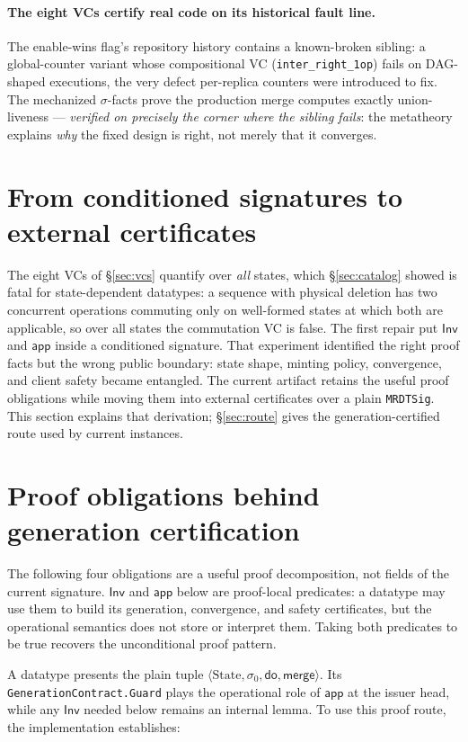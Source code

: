 \documentclass[11pt]{article}
\newcommand{\lean}[1]{\texttt{#1}}
\newcommand{\st}{\sigma}
\newcommand{\ini}{\st_0}
\newcommand{\dodo}{\mathsf{do}}
\newcommand{\merge}{\mathsf{merge}}
\newcommand{\Inv}{\mathsf{Inv}}
\newcommand{\app}{\mathsf{app}}
\begin{document}
\paragraph{The eight VCs certify real code on its historical fault
line.} The enable-wins flag's repository history contains a
known-broken sibling: a global-counter variant whose compositional VC
(\lean{inter\_right\_1op}) fails on DAG-shaped executions, the very defect
per-replica counters were introduced to fix. The mechanized $\sigma$-facts
prove the production merge computes exactly union-liveness ---
\emph{verified on precisely the corner where the sibling fails}: the
metatheory explains \emph{why} the fixed design is right, not merely that
it converges.


\section{From conditioned signatures to external certificates}
\label{sec:condmeta}

The eight VCs of \S\ref{sec:vcs} quantify over \emph{all} states, which
\S\ref{sec:catalog} showed is fatal for state-dependent datatypes: a
sequence with physical deletion has two concurrent operations commuting
only on well-formed states at which both are applicable, so over all
states the commutation VC is false. The first repair put $\Inv$ and $\app$
inside a conditioned signature. That experiment identified the right proof
facts but the wrong public boundary: state shape, minting policy, convergence,
and client safety became entangled. The current artifact retains the useful
proof obligations while moving them into external certificates over a plain
\lean{MRDTSig}. This section explains that derivation; \S\ref{sec:route} gives
the generation-certified route used by current instances.

\section{Proof obligations behind generation certification}\label{sec:cvcs}

The following four obligations are a useful proof decomposition, not fields of
the current signature. $\Inv$ and $\app$ below are proof-local predicates: a
datatype may use them to build its generation, convergence, and safety
certificates, but the operational semantics does not store or interpret them.
Taking both predicates to be true recovers the unconditional proof pattern.

A datatype presents the plain tuple
$\langle \text{State}, \ini, \dodo, \merge \rangle$. Its
\lean{GenerationContract.Guard} plays the operational role of $\app$ at the
issuer head, while any $\Inv$ needed below remains an internal lemma. To use
this proof route, the implementation establishes:
\end{document}
